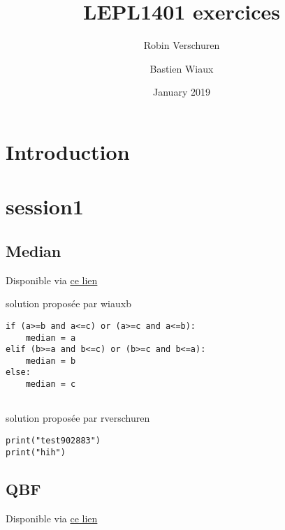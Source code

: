 \documentclass{article}
\title{LEPL1401 exercices}
\author{Robin Verschuren}
\author{Bastien Wiaux}
\date{January 2019}
\begin{document}
\maketitle
\tableofcontents

\section{Introduction}

\section{ session1 }

\subsection{ Median }

Disponible via \href{https://inginious.info.ucl.ac.be/course/LSINF1101-PYTHON/Median}{ce lien}

solution proposée par wiauxb
\begin{verbatim}
if (a>=b and a<=c) or (a>=c and a<=b):
    median = a
elif (b>=a and b<=c) or (b>=c and b<=a):
    median = b
else:
    median = c


\end{verbatim}

solution proposée par rverschuren
\begin{verbatim}
print("test902883")
print("hih")

\end{verbatim}


\subsection{ QBF }

Disponible via \href{https://inginious.info.ucl.ac.be/course/LSINF1101-PYTHON/QBF01}{ce lien}
\end{document}
